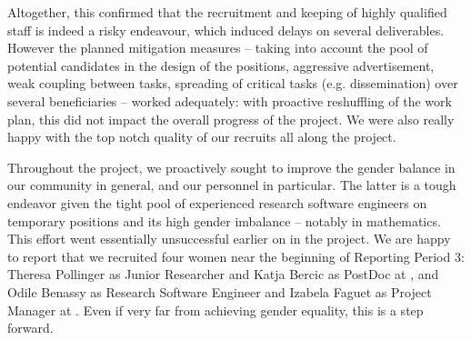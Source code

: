 
Altogether, this confirmed that the recruitment and keeping of highly
qualified staff is indeed a risky endeavour, which induced delays on
several deliverables. However the planned mitigation measures --
taking into account the pool of potential candidates in the design of
the positions, aggressive advertisement, weak coupling between tasks,
spreading of critical tasks (e.g. dissemination) over several
beneficiaries -- worked adequately: with proactive reshuffling of the
work plan, this did not impact the overall progress of the project. We
were also really happy with the top notch quality of our recruits all
along the project.

Throughout the project, we proactively sought to improve the gender
balance in our community in general, and our personnel in particular.
The latter is a tough endeavor given the tight pool of experienced
research software engineers on temporary positions and its high gender
imbalance -- notably in mathematics. This effort went essentially
unsuccessful earlier on in the project. We are happy to report that we
recruited four women near the beginning of Reporting Period 3: Theresa
Pollinger as Junior Researcher and Katja Bercic as PostDoc at
, and Odile Benassy as Research Software Engineer and
Izabela Faguet as Project Manager at . Even if very far from
achieving gender equality, this is a step forward.




